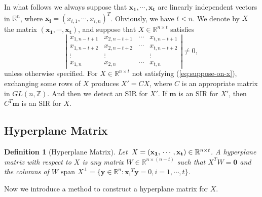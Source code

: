\documentclass{sig-alternate}
\newtheorem{defn}[theorem]{Definition}
\numberwithin{theorem}{section} \numberwithin{equation}{section}
\begin{document}
In what follows we always suppose that $\mathbf{x_1}, \cdots,
\mathbf{x_t}$ are linearly independent vectors in $\mathbb{R}^n$,
where $\mathbf{x_i} = (x_{i,1}, \cdots, x_{i,n})^T$. Obviously, we
have $t < n$. We denote by $X$ the matrix $(\mathbf{x_1}, \cdots,
\mathbf{x_t})$, and suppose that $X \in \mathbb{R}^{n\times t}$
satisfies
\begin{equation}\label{eq:suppose-on-x} \left|
  \begin{array}{cccc}
    x_{1,n-t+1} & x_{2,n-t+1} & \cdots & x_{t,n-t+1} \\
    x_{1,n-t+2} & x_{2,n-t+2}  & \cdots & x_{t,n-t+2}\\
    \vdots &\vdots& &\vdots\\
    x_{1,n} & x_{2,n}  & \cdots & x_{t,n}
  \end{array}
\right| \neq 0,\end{equation} unless otherwise specified. For $X \in
\mathbb{R}^{n\times t}$ not satisfying (\ref{eq:suppose-on-x}),
exchanging some rows of $X$ produces $X' = CX$, where $C$ is an
appropriate matrix in $GL(n, \mathbb{Z})$. And then we detect an SIR
for $X'$. If $\mathbf{m}$ is an SIR for $X'$, then $C^T\mathbf{m}$
is an SIR for $X$.
\subsection{Hyperplane Matrix}\label{subsec:Hyperplane-matrix}

\begin{defn}[Hyperplane Matrix]\label{def:Hyperplane-matrix}
Let~$X=(\mathbf{x_1},\\\cdots, \mathbf{x_t}) \in \mathbb{R}^{n\times
t}$. A hyperplane matrix  with respect to $X$ is any matrix $W \in
\mathbb{R}^{n\times(n-t)}$
 such that $X^TW = \mathbf{0}$ and the columns of $W$ $\mbox{span}$
$X^{\perp} = \{ \mathbf{y}\in\mathbb{R}^n: \mathbf{x_i}^T\mathbf{y}
= 0, i = 1, \cdots, t\}$.
\end{defn}

Now we introduce a method to construct a hyperplane matrix for  $X$.
\end{document}
